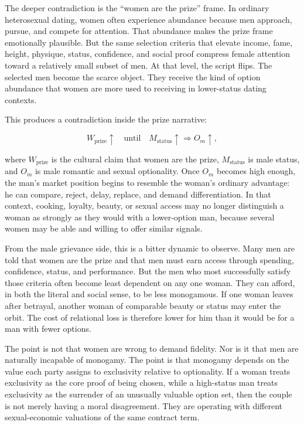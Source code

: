\documentclass[12pt]{article}
\begin{document}
The deeper contradiction is the ``women are the prize'' frame. In ordinary heterosexual dating, women often experience abundance because men approach, pursue, and compete for attention. That abundance makes the prize frame emotionally plausible. But the same selection criteria that elevate income, fame, height, physique, status, confidence, and social proof compress female attention toward a relatively small subset of men. At that level, the script flips. The selected men become the scarce object. They receive the kind of option abundance that women are more used to receiving in lower-status dating contexts.

This produces a contradiction inside the prize narrative:

\begin{equation}
  W_{\text{prize}} \uparrow
  \quad \text{until} \quad
  M_{\text{status}} \uparrow \Rightarrow O_m \uparrow,
\end{equation}

where $W_{\text{prize}}$ is the cultural claim that women are the prize, $M_{\text{status}}$ is male status, and $O_m$ is male romantic and sexual optionality. Once $O_m$ becomes high enough, the man's market position begins to resemble the woman's ordinary advantage: he can compare, reject, delay, replace, and demand differentiation. In that context, cooking, loyalty, beauty, or sexual access may no longer distinguish a woman as strongly as they would with a lower-option man, because several women may be able and willing to offer similar signals.

From the male grievance side, this is a bitter dynamic to observe. Many men are told that women are the prize and that men must earn access through spending, confidence, status, and performance. But the men who most successfully satisfy those criteria often become least dependent on any one woman. They can afford, in both the literal and social sense, to be less monogamous. If one woman leaves after betrayal, another woman of comparable beauty or status may enter the orbit. The cost of relational loss is therefore lower for him than it would be for a man with fewer options.

The point is not that women are wrong to demand fidelity. Nor is it that men are naturally incapable of monogamy. The point is that monogamy depends on the value each party assigns to exclusivity relative to optionality. If a woman treats exclusivity as the core proof of being chosen, while a high-status man treats exclusivity as the surrender of an unusually valuable option set, then the couple is not merely having a moral disagreement. They are operating with different sexual-economic valuations of the same contract term.
\end{document}
